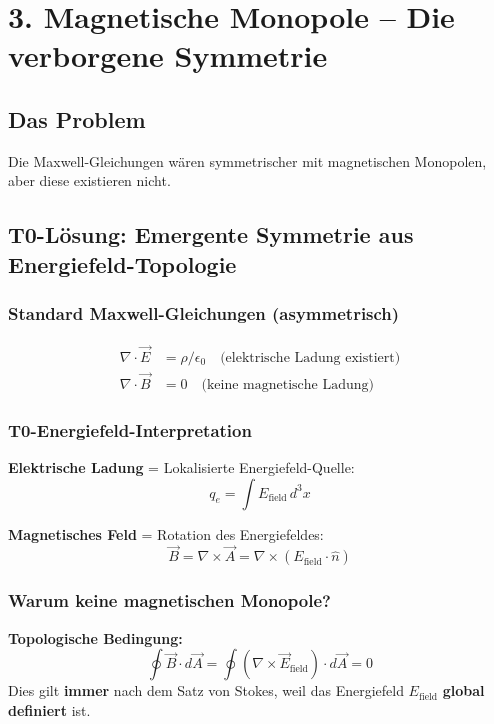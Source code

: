 	
	
	\section*{3. Magnetische Monopole – Die verborgene Symmetrie}
	
	\subsection*{Das Problem}
	Die Maxwell-Gleichungen wären symmetrischer mit magnetischen Monopolen, aber diese existieren nicht.
	
	\subsection*{T0-Lösung: Emergente Symmetrie aus Energiefeld-Topologie}
	
	\subsubsection*{Standard Maxwell-Gleichungen (asymmetrisch)}
	\begin{align*}
		\nabla \cdot \vec{E} &= \rho/\epsilon_0 \quad \text{(elektrische Ladung existiert)} \\
		\nabla \cdot \vec{B} &= 0 \quad \text{(keine magnetische Ladung)}
	\end{align*}
	
	\subsubsection*{T0-Energiefeld-Interpretation}
	
	\textbf{Elektrische Ladung} = Lokalisierte Energiefeld-Quelle:
	\[
	q_e = \int E_{\text{field}} \, d^3x
	\]
	
	\textbf{Magnetisches Feld} = Rotation des Energiefeldes:
	\[
	\vec{B} = \nabla \times \vec{A} = \nabla \times (E_{\text{field}} \cdot \hat{n})
	\]
	
	\subsubsection*{Warum keine magnetischen Monopole?}
	
	\textbf{Topologische Bedingung:}
	\[
	\oint \vec{B} \cdot d\vec{A} = \oint (\nabla \times \vec{E}_{\text{field}}) \cdot d\vec{A} = 0
	\]
	Dies gilt \textbf{immer} nach dem Satz von Stokes, weil das Energiefeld $E_{\text{field}}$ \textbf{global definiert} ist.
	
